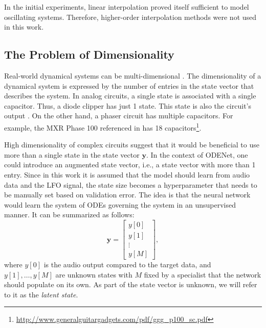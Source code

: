 In the initial experiments, linear interpolation proved itself sufficient to model oscillating systems. Therefore, higher-order interpolation methods were not used in this work.

\subsection{The Problem of Dimensionality}
\label{subsec:dimensionality}
Real-world dynamical systems can be multi-dimensional \cite{Scheinerman1996}. The dimensionality of a dynamical system is expressed by the number of entries in the state vector that describes the system. In analog circuits, a single state is associated with a single capacitor. Thus, a diode clipper has just 1 state. This state is also the circuit's output \cite{Parker2019}. On the other hand, a phaser circuit has multiple capacitors. For example, the MXR Phase 100 referenced in \cite{Kiiski2016} has 18 capacitors\footnote{\url{http://www.generalguitargadgets.com/pdf/ggg_p100_sc.pdf}}.

High dimensionality of complex circuits suggest that it would be beneficial to use more than a single state in the state vector $\pmb{y}$. In the context of ODENet, one could introduce an augmented state vector, i.e., a state vector with more than 1 entry. Since in this work it is assumed that the model should learn from audio data and the LFO signal, the state size becomes a hyperparameter that needs to be manually set based on validation error. The idea is that the neural network would learn the system of \acp{ODE} governing the system in an unsupervised manner. It can be summarized as follows:
\begin{equation}
  \pmb{y} = \begin{bmatrix}
    y[0] \\
    y[1] \\
    \vdots \\
    y[M]
  \end{bmatrix},
\end{equation}
where $y[0]$ is the audio output compared to the target data, and $y[1], \dots, y[M]$ are unknown states with $M$ fixed by a specialist that the network should populate on its own. As part of the state vector is unknown, we will refer to it as the \emph{latent state}.

